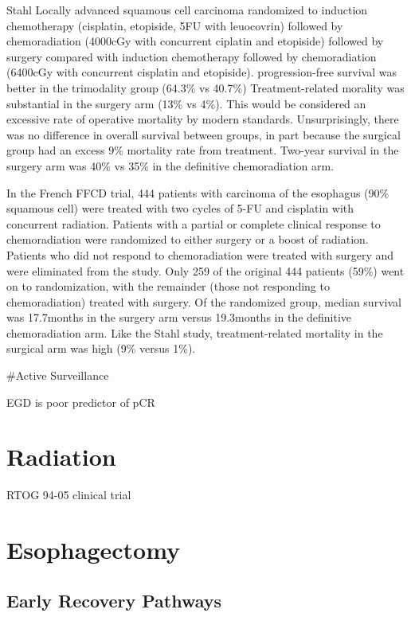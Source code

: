 \documentclass[
]{book}
\begin{document}
Stahl Locally advanced squamous cell carcinoma randomized to induction chemotherapy (cisplatin, etopiside, 5FU with leuocovrin) followed by chemoradiation (4000cGy with concurrent ciplatin and etopiside) followed by surgery compared with induction chemotherapy followed by chemoradiation (6400cGy with concurrent cisplatin and etopiside).\citep{stahl2310} progression-free survival was better in the trimodality group (64.3\% vs 40.7\%) Treatment-related morality was substantial in the surgery arm (13\% vs 4\%). This would be considered an excessive rate of operative mortality by modern standards. Unsurprisingly, there was no difference in overall survival between groups, in part because the surgical group had an excess 9\% mortality rate from treatment. Two-year survival in the surgery arm was 40\% vs 35\% in the definitive chemoradiation arm.

In the French FFCD trial, 444 patients with carcinoma of the esophagus (90\% squamous cell) were treated with two cycles of 5-FU and cisplatin with concurrent radiation.\citep{bedenne1160} Patients with a partial or complete clinical response to chemoradiation were randomized to either surgery or a boost of radiation. Patients who did not respond to chemoradiation were treated with surgery and were eliminated from the study. Only 259 of the original 444 patients (59\%) went on to randomization, with the remainder (those not responding to chemoradiation) treated with surgery. Of the randomized group, median survival was 17.7months in the surgery arm versus 19.3months in the definitive chemoradiation arm. Like the Stahl study, treatment-related mortality in the surgical arm was high (9\% versus 1\%).

\#Active Surveillance

EGD is poor predictor of pCR \citep{sarkaria764}

\hypertarget{radiation}{%
\chapter{Radiation}\label{radiation}}

RTOG 94-05 clinical trial \citep{minsky1167}

\hypertarget{esophagectomy}{%
\chapter{Esophagectomy}\label{esophagectomy}}

\hypertarget{early-recovery-pathways}{%
\section{Early Recovery Pathways}\label{early-recovery-pathways}}
\end{document}
